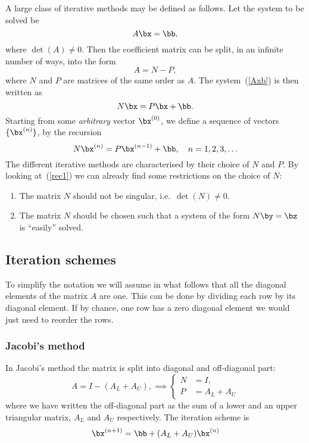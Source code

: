 A large class of iterative methods may be defined as follows.   Let
the system to be solved be
%
\begin{equation}
 A \bx = \bb , \label{Axb}
\end{equation}
%
where $\det(A) \ne 0$.   Then the coefficient matrix can be
split, in an infinite number of ways, into the form
%
\begin{equation*}
  A = N - P ,
\end{equation*}
%
where $N$ and $P$ are matrices of the same order as $A$.    The
system~(\ref{Axb}) is then written as
%
\begin{equation}
  N \bx = P \bx + \bb. \label{NxPxb}
\end{equation}
%
Starting from some \textit{arbitrary} vector $\bx^{(0)}$, we define a
sequence of vectors $\{ \bx^{(n)}\}$, by the recursion
%
\begin{equation}
  N \bx^{(n)} = P \bx^{(n-1)} + \bb, \quad n=1,2,3,\ldots
  \label{rec1}
\end{equation}
%
The different iterative methods are characterised by their choice of
$N$ and $P$.      By looking at~(\ref{rec1}) we can already find
some restrictions on the choice of $N$:
%
\begin{enumerate}
\item The matrix $N$ should not be singular, i.e.\ $\det(N) \ne 0$.
\item The matrix $N$ should be chosen such that a system of the form
  $N \by = \bz$ is ``easily'' solved.
\end{enumerate}
%

\subsection{Iteration schemes}

To simplify the notation we will assume in what follows that all the
diagonal elements of the matrix $A$ are one.   This can be done by
dividing each row by its diagonal element.   If by chance, one row has
a zero diagonal element we would just need to reorder the rows.

\subsubsection{Jacobi's method}

In Jacobi's method the matrix is split into diagonal and off-diagonal
part:
%
\begin{equation*}
  A = I - ( A_L + A_U ) , \implies
  \begin{cases}
    N &= I , \\ P &= A_L+A_U
  \end{cases}
\end{equation*}
%
where we have written the off-diagonal part as the sum of a lower and
an upper triangular matrix, $A_L$ and $A_U$ respectively.   The iteration
scheme is
%
\begin{equation*}
  \bx^{(n+1)} = \bb + ( A_L + A_U ) \bx^{(n)}
\end{equation*}

